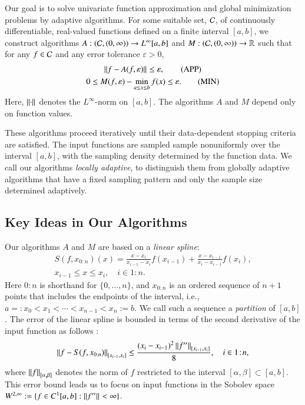 \documentclass[review]{elsarticle}
\newcommand{\abstol}{\varepsilon}
\newcommand{\oton}{1\!:\!n}
\newcommand{\datasites}{x_{0:n}}
\theoremstyle{definition}
\renewcommand{\cw}{W}
\begin{document}
Our goal is to solve univariate function approximation and global minimization
problems by adaptive algorithms. For some suitable set, $\cc$, of continuously
differentiable, real-valued functions defined on a finite interval $[a,b]$, we
construct algorithms $A:(\cc,(0,\infty)) \to L^{\infty}[a,b]$ and $M:
(\cc,(0,\infty)) \to \reals$ such that for any $f \in \cc$ and any error
tolerance $\abstol > 0$, \begin{gather} \norm{f - A(f,\abstol)} \le \abstol,
\tag{APP} \label{appxprob} \\ 0 \le M(f,\abstol) - \min_{a \le x \le b} f(x) \le
\abstol. \tag{MIN} \label{optprob} \end{gather} Here, $\norm{\cdot}$ denotes the
$L^{\infty}$-norm on $[a,b]$. The algorithms $A$ and $M$ depend only on function
values.

These algorithms proceed iteratively until their data-dependent stopping
criteria are satisfied. The input functions are sampled sample nonuniformly over
the interval $[a,b]$, with the sampling density determined by the function data.
We call our algorithms \emph{locally adaptive}, to distinguish them from
globally adaptive algorithms that have a fixed sampling pattern and only the
sample size determined adaptively.

\subsection{Key Ideas in Our Algorithms} \label{subsec:keyideas}

Our algorithms $A$ and $M$ are based on a \emph{linear spline}:
\begin{multline} \label{splinedef}
   S(f,\datasites)(x) =
   \frac{x-x_i}{x_{i-1} - x_i} f(x_{i-1}) + \frac{x-x_{i-1}}{x_{i} - x_{i-1}}f(x_i),
\\ x_{i-1} \le x \le x_i, \quad i \in \oton.
\end{multline}
Here ${0\!:\!n}$ is shorthand for $\{0, \ldots, n\}$, and $\datasites$ is an
ordered sequence of $n+1$ points that includes the endpoints of the interval,
i.e., $a=:x_0 <x_1 < \cdots < x_{n-1} < x_{n}:=b$. We call such a sequence a
\emph{partition} of $[a,b]$. The error of the linear spline is bounded in terms
of the second derivative of the input function as follows \cite[Theorem
3.3]{BurFaiBur16a}:
\begin{equation} \label{appxerrbda}
	\norm[{[x_{i-1},x_i]}]{f - S(f,\datasites)}
	\le \frac{(x_i - x_{i-1})^2\norm[{[x_{i-1},x_i]}]{f''}}{8}, \quad i \in \oton,
\end{equation}
where $\norm[{[\alpha,\beta]}]{f}$ denotes the norm of $f$ restricted to the
interval $[\alpha,\beta] \subset [a,b]$. This error bound leads us to focus on
input functions in the Sobolev space $\cw^{2,\infty} := \{f \in C^1[a,b] :
\norm{f''} < \infty \}$.
\end{document}
